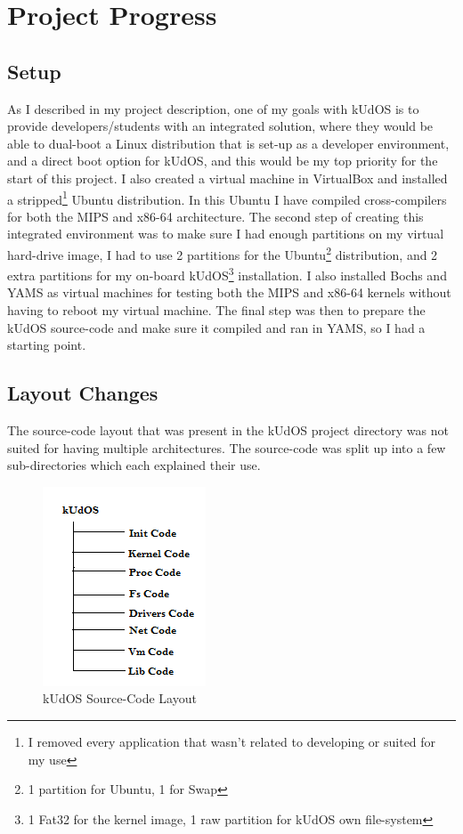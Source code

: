 \newpage
\section{Project Progress}

\subsection{Setup}

As I described in my project description, one of my goals with kUdOS is to provide developers/students with an integrated solution, where they would be able to dual-boot a Linux distribution that is set-up as a developer environment, and a direct boot option for kUdOS, and this would be my top priority for the start of this project. I also created a virtual machine in VirtualBox and installed a stripped\footnote{I removed every application that wasn't related to developing or suited for my use} Ubuntu distribution. In this Ubuntu I have compiled cross-compilers for both the MIPS and x86-64 architecture. The second step of creating this integrated environment was to make sure I had enough partitions on my virtual hard-drive image, I had to use 2 partitions for the Ubuntu\footnote{1 partition for Ubuntu, 1 for Swap} distribution, and 2 extra partitions for my on-board kUdOS\footnote{1 Fat32 for the kernel image, 1  raw partition for kUdOS own file-system} installation. I also installed Bochs and YAMS as virtual machines for testing both the MIPS and x86-64 kernels without having to reboot my virtual machine. The final step was then to prepare the kUdOS source-code and make sure it compiled and ran in YAMS, so I had a starting point.

\subsection{Layout Changes}

The source-code layout that was present in the kUdOS project directory was not suited for having multiple architectures. The source-code was split up into a few sub-directories which each explained their use.

\begin{figure}[h]
    \centering
    \includegraphics{DirectoryLayoutBegin.png}
    \caption{kUdOS Source-Code Layout}
    \label{fig:code_layout_end}
\end{figure}

